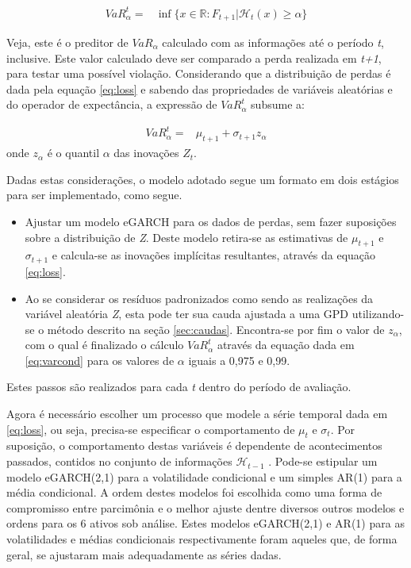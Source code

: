 \documentclass[1p]{elsarticle}
\theoremstyle{definition}
\begin{document}
\begin{align}
VaR_\alpha^t=&\inf\{x \in \mathbb{R}: F_{t+1} | \mathcal{H}_t(x) \geq \alpha\}
\end{align}

Veja, este é o preditor de $VaR_\alpha$ calculado com as informações até o período \emph{t}, inclusive. Este valor calculado deve ser comparado a perda realizada em \emph{t+1}, para testar uma possível violação.
Considerando que a distribuição de perdas é dada pela equação \eqref{eq:loss} e sabendo das propriedades de variáveis aleatórias e do operador de expectância, a expressão de $VaR_\alpha^t$ subsume a:

\begin{align}
\label{eq:varcond} 
VaR_\alpha^t=&\mu_{t+1}+\sigma_{t+1}z_\alpha 
\end{align}
onde $z_\alpha$ é o quantil $\alpha$ das inovações $Z_t$.

Dadas estas considerações, o modelo adotado segue um formato em dois estágios para ser implementado, como segue.
\begin{itemize}
	\item Ajustar um modelo eGARCH para os dados de perdas, sem fazer suposições sobre a distribuição de \emph{Z}. Deste modelo retira-se as estimativas de $\mu_{t+1}$ e $\sigma_{t+1}$ e calcula-se as inovações implícitas resultantes, através da equação \eqref{eq:loss}.
	\item Ao se considerar os resíduos padronizados como sendo as realizações da variável aleatória \emph{Z}, esta pode ter sua cauda ajustada a uma GPD utilizando-se o método descrito na seção \ref{sec:caudas}. Encontra-se por fim o valor de $z_\alpha$, com o qual é finalizado o cálculo $VaR_\alpha^t$ através da equação dada em \eqref{eq:varcond} para os valores de $\alpha$ iguais a 0,975 e 0,99.
\end{itemize}

Estes passos são realizados para cada \emph{t} dentro do período de avaliação.

Agora é necessário escolher um processo que modele a série temporal dada em \eqref{eq:loss}, ou seja, precisa-se especificar o comportamento de $\mu_t$ e $\sigma_t$. Por suposição, o comportamento destas variáveis é dependente de acontecimentos passados, contidos no conjunto de informações $\mathcal{H}_{t-1}$ . Pode-se estipular um modelo eGARCH(2,1) para a volatilidade condicional e um simples AR(1) para a média condicional. A ordem destes modelos foi escolhida como uma forma de compromisso entre parcimônia e o melhor ajuste dentre diversos outros modelos e ordens para os 6 ativos sob análise. Estes modelos eGARCH(2,1) e AR(1) para as volatilidades e médias condicionais respectivamente foram aqueles que, de forma geral, se ajustaram mais adequadamente as séries dadas.
\end{document}
